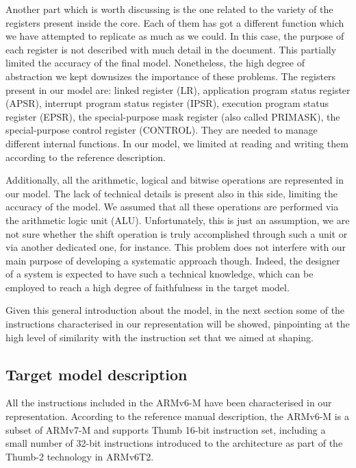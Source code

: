 \documentclass[conference]{IEEEtran}
\begin{document}
Another part which is worth discussing is the one related to the variety of the
registers present inside the core. Each of them has got a different function which we have
attempted to replicate as much as we could. In this case, the purpose of each register
is not described with much detail in the document. This partially limited the accuracy of the
final model. Nonetheless, the high degree of abstraction we kept downsizes the importance of
these problems. The registers present in our model are: linked register (LR), application
program status register (APSR), interrupt program status register (IPSR), execution program
status register (EPSR), the special-purpose mask register (also called PRIMASK), the 
special-purpose control register (CONTROL). They are needed to manage different internal
functions. In our model, we limited at reading and writing them according to the reference
description.

Additionally, all the arithmetic, logical and bitwise operations are represented in our
model. The lack of technical details is present also in this side, limiting the accuracy of
the model. We assumed that all these operations are
performed via the arithmetic logic unit (ALU). Unfortunately, this is just an
assumption, we are not sure whether the shift operation is truly accomplished
through such a unit or via another dedicated one, for instance.
This problem does not interfere with our main purpose of
developing a systematic approach though. Indeed, the designer of a system is expected to have
such a technical knowledge, which can be employed to reach a high degree of faithfulness in
the target model.

Given this general introduction about the model, in the next section some of the instructions
characterised in our representation will be showed, pinpointing at the high level of
similarity with the instruction set that we aimed at shaping.

\subsection{Target model description}
\label{sec:mod}
All the instructions included in the ARMv6-M have been characterised in our representation.
According to the reference manual description, the ARMv6-M is a subset of ARMv7-M and
supports Thumb 16-bit instruction set, including a small number of 32-bit instructions
introduced to the architecture as part of the Thumb-2 technology in ARMv6T2. 
\end{document}
